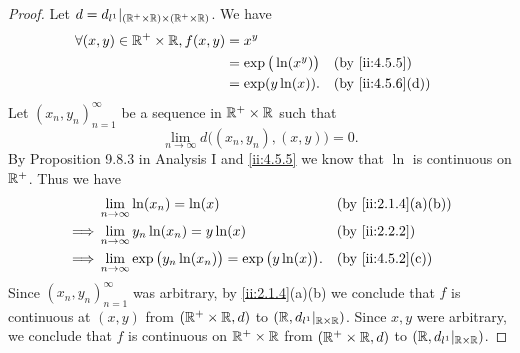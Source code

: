 \begin{proof}
  Let \(d = d_{l^1}|_{(\mathbb{R}^+ \times \mathbb{R}) \times (\mathbb{R}^+ \times \mathbb{R})}\).
  We have
  \begin{align*}
    \forall (x, y) \in \R^+ \times \R, f(x, y) & = x^y                                          \\
                                               & = \exp\big(\ln(x^y)\big) &  & \by{ii:4.5.5}    \\
                                               & = \exp(y \ln(x)).        &  & \by{ii:4.5.6}[d]
  \end{align*}
  Let \((x_n, y_n)_{n = 1}^\infty\) be a sequence in \(\mathbb{R}^+ \times \mathbb{R}\) such that
  \[
    \lim_{n \to \infty} d\big((x_n, y_n), (x, y)\big) = 0.
  \]
  By Proposition 9.8.3 in Analysis I and \cref{ii:4.5.5} we know that \(\ln\) is continuous on \(\mathbb{R}^+\).
  Thus we have
  \begin{align*}
             & \lim_{n \to \infty} \ln(x_n) = \ln(x)                                    &  & \by{ii:2.1.4}[a,b] \\
    \implies & \lim_{n \to \infty} y_n \ln(x_n) = y \ln(x)                              &  & \by{ii:2.2.2}      \\
    \implies & \lim_{n \to \infty} \exp\big(y_n \ln(x_n)\big) = \exp\big(y \ln(x)\big). &  & \by{ii:4.5.2}[c]
  \end{align*}
  Since \((x_n, y_n)_{n = 1}^\infty\) was arbitrary, by \cref{ii:2.1.4}(a)(b) we conclude that \(f\) is continuous at \((x, y)\) from \((\mathbb{R}^+ \times \mathbb{R}, d)\) to \((\mathbb{R}, d_{l^1}|_{\mathbb{R} \times \mathbb{R}})\).
  Since \(x, y\) were arbitrary, we conclude that \(f\) is continuous on \(\mathbb{R}^+ \times \mathbb{R}\) from \((\mathbb{R}^+ \times \mathbb{R}, d)\) to \((\mathbb{R}, d_{l^1}|_{\mathbb{R} \times \mathbb{R}})\).
\end{proof}
